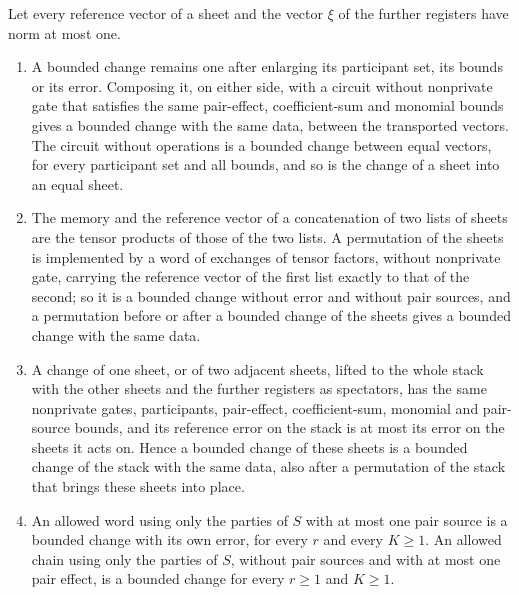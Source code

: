 \begin{lemma}
    \leanok
    Let every reference vector of a sheet and the vector $\xi$ of the further
    registers have norm at most one.
    \begin{enumerate}
        \item A bounded change remains one after enlarging its participant set, its
              bounds or its error. Composing it, on either side, with a circuit without
              nonprivate gate that satisfies the same pair-effect, coefficient-sum and
              monomial bounds gives a bounded change with the same data, between the
              transported vectors. The circuit without operations is a bounded change
              between equal vectors, for every participant set and all bounds, and so is
              the change of a sheet into an equal sheet.
        \item The memory and the reference vector of a concatenation of two lists of
              sheets are the tensor products of those of the two lists. A permutation of
              the sheets is implemented by a word of exchanges of tensor factors, without
              nonprivate gate, carrying the reference vector of the first list exactly to
              that of the second; so it is a bounded change without error and without pair
              sources, and a permutation before or after a bounded change of the sheets
              gives a bounded change with the same data.
        \item A change of one sheet, or of two adjacent sheets, lifted to the whole
              stack with the other sheets and the further registers as spectators, has the
              same nonprivate gates, participants, pair-effect, coefficient-sum, monomial
              and pair-source bounds, and its reference error on the stack is at most its
              error on the sheets it acts on. Hence a bounded change of these sheets is a
              bounded change of the stack with the same data, also after a permutation of
              the stack that brings these sheets into place.
        \item An allowed word using only the parties of $S$ with at most one pair source
              is a bounded change with its own error, for every $r$ and every $K\ge1$. An
              allowed chain using only the parties of $S$, without pair sources and with at
              most one pair effect, is a bounded change for every $r\ge1$ and $K\ge1$.
    \end{enumerate}
\end{lemma}

